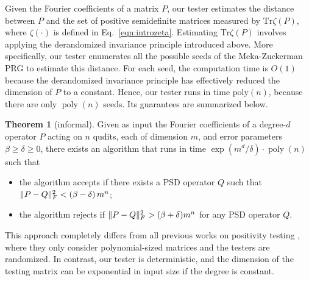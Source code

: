 \documentclass[10pt,a4paper]{article}
\theoremstyle{plain}
\theoremstyle{definition}
\newcommand {\br} [1] {\ensuremath{ \left( #1 \right) }}
\DeclarePairedDelimiter{\norm}{\lVert}{\rVert}
\newcommand {\Tr} {\ensuremath{ \mathrm{Tr} }}
\newtheorem*{theorem*}{Theorem}
\newcommand{\poly} {\ensuremath{\operatorname{poly}}}
\newcommand{\1}{\mathbb{1}} %
\begin{document}
Given the Fourier coefficients of a matrix $P$,
our tester estimates the distance between $P$ and the set of positive semidefinite matrices measured by $\Tr\zeta\br{P}$, where $\zeta\br{\cdot}$ is defined in Eq.~\eqref{eqn:introzeta}. 
Estimating $\Tr\zeta\br{P}$ involves applying the derandomized invariance principle introduced above.
More specifically, our tester enumerates all the possible seeds of the Meka-Zuckerman PRG to estimate this distance.
For each seed, the computation time is $O(1)$ because the derandomized invariance principle has effectively reduced the dimension of $P$ to a constant.
Hence, our tester runs in time $\mathrm{poly}(n)$, because there are only $\poly(n)$ seeds. 
Its guarantees are summarized below.


\begin{theorem*}[informal]
  Given as input the Fourier coefficients of a degree-$d$ operator $P$ acting on $n$ qudits, each of dimension $m$, 
  and error parameters $\beta\ge\delta\ge0$,
there exists an algorithm that runs in time $\exp(m^d/\delta)\cdot \poly(n)$
  such that
  \begin{itemize}
    \item the algorithm accepts if there exists a PSD operator $Q$ such that $\norm{P-Q}_F^2<\br{\beta-\delta}m^n$;
\item the algorithm rejects if $\norm{P-Q}_F^2>(\beta+\delta)m^n$ for any PSD operator $Q$.
  \end{itemize}
\end{theorem*}

 This approach completely differs from all previous works on positivity testing \cite{9996743,han2017approximating,bakshi2020testing}, where they only consider polynomial-sized matrices and the testers are randomized. In contrast, our tester is deterministic, and the dimension of the testing matrix can be exponential in input size if the degree is constant.
\end{document}
